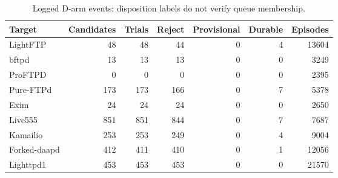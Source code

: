 \begin{table}[!tbp]
\centering\small
\caption{Logged D-arm events; disposition labels do not verify queue membership.}
\label{tab:observed_log_counts}
\begin{tabular}{lrrrrrr}
\toprule
Target & Candidates & Trials & Reject & Provisional & Durable & Episodes \\
\midrule
LightFTP & 48 & 48 & 44 & 0 & 4 & 13604 \\
bftpd & 13 & 13 & 13 & 0 & 0 & 3249 \\
ProFTPD & 0 & 0 & 0 & 0 & 0 & 2395 \\
Pure-FTPd & 173 & 173 & 166 & 0 & 7 & 5378 \\
Exim & 24 & 24 & 24 & 0 & 0 & 2650 \\
Live555 & 851 & 851 & 844 & 0 & 7 & 7687 \\
Kamailio & 253 & 253 & 249 & 0 & 4 & 9004 \\
Forked-daapd & 412 & 411 & 410 & 0 & 1 & 12056 \\
Lighttpd1 & 453 & 453 & 453 & 0 & 0 & 21570 \\
\bottomrule
\end{tabular}
\end{table}

